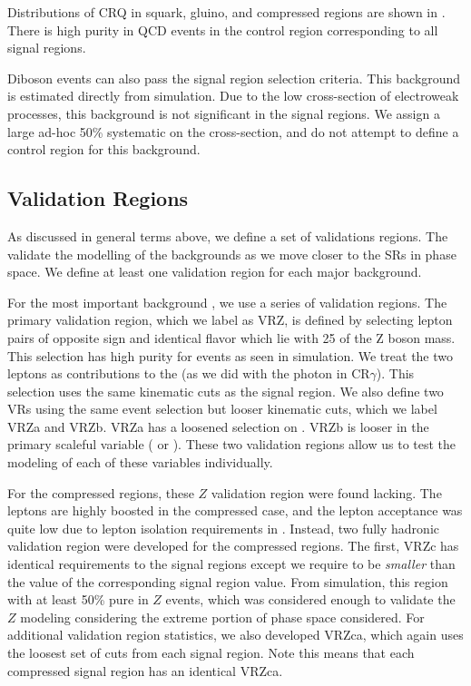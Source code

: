 Distributions of CRQ in squark, gluino, and compressed regions are shown in .
There is high purity in QCD events in the control region corresponding to all signal regions.

Diboson events can also pass the signal region selection criteria.
This background is estimated directly from simulation.
Due to the low cross-section of electroweak processes, this background is not significant in the signal regions.
We assign a large ad-hoc 50\% systematic on the cross-section, and do not attempt to define a control region for this background.




\subsection{Validation Regions}

As discussed in general terms above, we define a set of validations regions.
The validate the modelling of the backgrounds as we move closer to the SRs in phase space.
We define at least one validation region for each major background.

For the most important background \Zvv, we use a series of validation regions.
The primary validation region, which we label as VRZ, is defined by selecting lepton pairs of opposite sign and identical flavor which lie with 25 \GeV of the Z boson mass.
This selection has high purity for \Zll events as seen in simulation.
We treat the two leptons as contributions to the \met (as we did with the photon in CR$\gamma$).
This selection uses the same kinematic cuts as the signal region.
We also define two VRs using the same event selection but looser kinematic cuts, which we label VRZa and VRZb.
VRZa has a loosened selection on .
VRZb is looser in the primary scaleful variable  ( or ).
These two validation regions allow us to test the modeling of each of these variables individually.

For the compressed regions, these $Z$ validation region were found lacking.
The leptons are highly boosted in the compressed case, and the lepton acceptance was quite low due to lepton isolation requirements in \deltaR.
Instead, two fully hadronic validation region were developed for the compressed regions.
The first, VRZc has identical requirements to the signal regions except we require \dphiISR to be \textit{smaller} than the value of the corresponding signal region value.
From simulation, this region with at least 50\% pure in $Z$ events, which was considered enough to validate the $Z$ modeling considering the extreme portion of phase space considered.
For additional validation region statistics, we also developed VRZca, which again uses the loosest set of cuts from each signal region.
Note this means that each compressed signal region has an identical VRZca.

